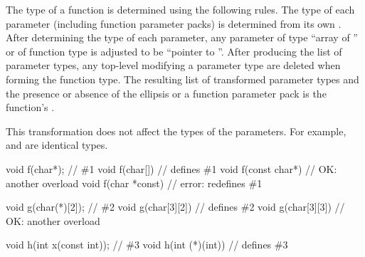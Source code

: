 \pnum
{}%
The type of a function is determined using the following rules.
The type of each parameter (including function parameter packs) is
determined from its own .
After determining the type of each parameter, any parameter
%
of type ``array of '' or
%
of function type 
is adjusted to be ``pointer to ''.
After producing the list of parameter types,
any top-level
modifying a parameter type are deleted
when forming the function type.
The resulting list of transformed parameter types
and the presence or absence of the ellipsis or a function parameter pack
is the function's
.
\begin{note}
This transformation does not affect the types of the parameters.
For example,  and
 are identical types.
\end{note}
\begin{example}
\begin{codeblock}
void f(char*);                  // \#1
void f(char[]) {}               // defines \#1
void f(const char*) {}          // OK: another overload
void f(char *const) {}          // error: redefines \#1

void g(char(*)[2]);             // \#2
void g(char[3][2]) {}           // defines \#2
void g(char[3][3]) {}           // OK: another overload

void h(int x(const int));       // \#3
void h(int (*)(int)) {}         // defines \#3
\end{codeblock}
\end{example}

